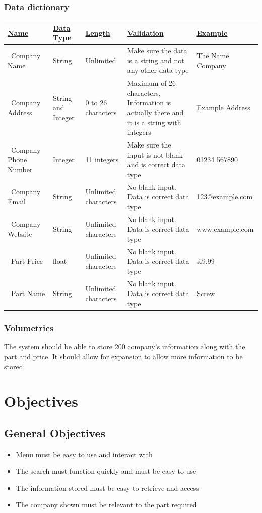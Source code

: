 \subsubsection{Data dictionary}
\begin{center}
\begin{tabular}{ | m{2cm} | m{2cm} | m{2cm} | m{3cm} | m{3cm} | } 
\hline
\underline{\bf Name}& \bf\underline{Data Type} & \bf\underline{Length} & \bf\underline{Validation} & \bf\underline{Example}

\\
\hline
\ Company Name & String & Unlimited & Make sure the data is a string and not any other data type & The Name Company\\ 
\hline
\ Company Address & String and Integer & 0 to 26 characters & Maximum of 26 characters, Information is actually there and it is a string with integers & Example Address\\
\hline
\ Company Phone Number & Integer & 11 integers & Make sure the input is not blank and is correct data type & 01234 567890\\
\hline
\ Company Email & String & Unlimited characters & No blank input. Data is correct data type & 123@example.com\\
\hline
\ Company Website & String & Unlimited characters & No blank input. Data is correct data type & www.example.com\\
\hline
\ Part Price & float & Unlimited characters & No blank input. Data is correct data type & £9.99\\
\hline
\ Part Name & String & Unlimited characters & No blank input. Data is correct data type & Screw\\
\hline
\end{tabular}
\end{center}
\subsubsection{Volumetrics}
The system should be able to store 200 company's information along with the part and price. It should allow for expansion to allow more information to be stored. 

\section{Objectives}

\subsection{General Objectives}
\begin{itemize}
	\item Menu must be easy to use and interact with
	\item The search must function quickly and must be easy to use
	\item The information stored must be easy to retrieve and access
	\item The company shown must be relevant to the part required
\end{itemize}

